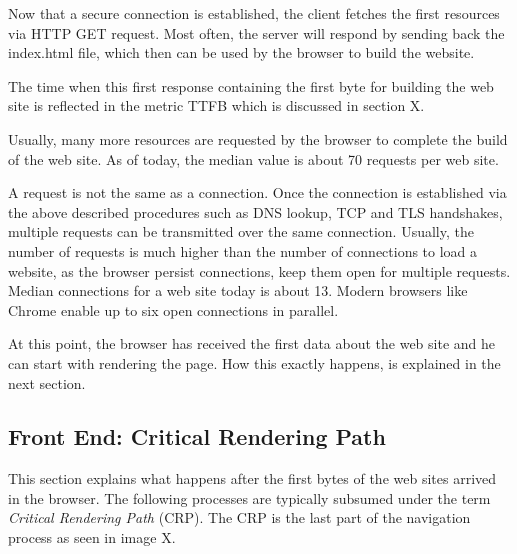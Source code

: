 Now that a secure connection is established, the client fetches the first resources via HTTP GET request.
Most often, the server will respond by sending back the index.html file, which then can be used by the browser to build the website. %

The time when this first response containing the first byte for building the web site is reflected in the metric TTFB which is discussed in section X.



Usually, many more resources are requested by the browser to complete the build of the web site.
As of today, the median value is about 70 requests per web site. %

A request is not the same as a connection.
Once the connection is established via the above described procedures such as DNS lookup, TCP and TLS handshakes, multiple requests can be transmitted over the same connection.
Usually, the number of requests is much higher than the number of connections to load a website, as the browser persist connections, keep them open for multiple requests.
Median connections for a web site today is about 13. %
Modern browsers like Chrome enable up to six open connections in parallel. %




At this point, the browser has received the first data about the web site and he can start with rendering the page.
How this exactly happens, is explained in the next section.







\subsection{Front End: Critical Rendering Path}

This section explains what happens after the first bytes of the web sites arrived in the browser.
The following processes are typically subsumed under the term \textit{Critical Rendering Path} (CRP).
The CRP is the last part of the navigation process as seen in image X.



